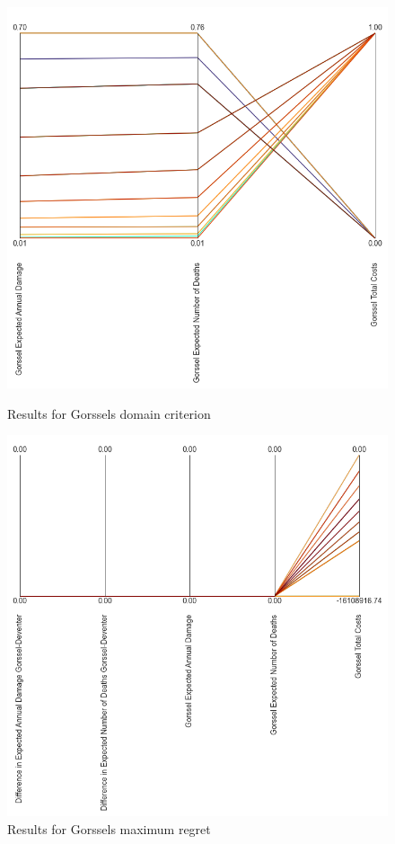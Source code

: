 \begin{figure}[H]
  \centering
  \begin{minipage}[b]{0.4\textwidth}
    \includegraphics[width=1.15\textwidth]{report/figures/results/domain_criterion_Gorssel.png}
    \caption{Results for Gorssels domain criterion}
    \label{fig:domain_criterion_gorssel}
  \end{minipage}
  \hfill
  \begin{minipage}[b]{0.4\textwidth}
    \includegraphics[width=1.15\textwidth]{report/figures/results/regret_figure_Gorssel.png}
    \caption{Results for Gorssels maximum regret}
    \label{fig:regret_gorssel}
  \end{minipage}
\end{figure}




